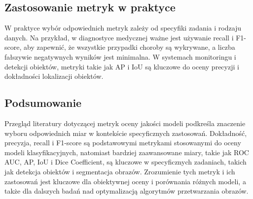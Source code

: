 \subsection*{Zastosowanie metryk w praktyce}

W praktyce wybór odpowiednich metryk zależy od specyfiki zadania i rodzaju danych. Na przykład, 
w diagnostyce medycznej ważne jest używanie recall i F1-score, aby zapewnić, że wszystkie przypadki 
choroby są wykrywane, a liczba fałszywie negatywnych wyników jest minimalna. W systemach monitoringu 
i detekcji obiektów, metryki takie jak AP i IoU są kluczowe do oceny precyzji i dokładności 
lokalizacji obiektów.

\subsection*{Podsumowanie}

Przegląd literatury dotyczącej metryk oceny jakości modeli podkreśla znaczenie wyboru odpowiednich 
miar w kontekście specyficznych zastosowań. Dokładność, precyzja, recall i F1-score są podstawowymi 
metrykami stosowanymi do oceny modeli klasyfikacyjnych, natomiast bardziej zaawansowane miary, takie 
jak ROC AUC, AP, IoU i Dice Coefficient, są kluczowe w specyficznych zadaniach, takich jak detekcja 
obiektów i segmentacja obrazów. Zrozumienie tych metryk i ich zastosowań jest kluczowe dla obiektywnej 
oceny i porównania różnych modeli, a także dla dalszych badań nad optymalizacją algorytmów 
przetwarzania obrazów.
